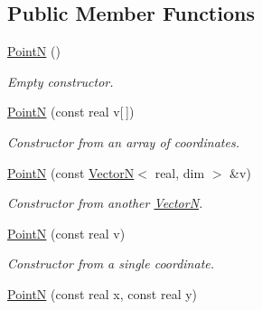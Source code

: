 \subsection*{Public Member Functions}
\begin{DoxyCompactItemize}
\item 
\hypertarget{classPointN_aeecdfb6e7bc275830b3910790a12d30c}{
\hyperlink{classPointN_aeecdfb6e7bc275830b3910790a12d30c}{PointN} ()}
\label{classPointN_aeecdfb6e7bc275830b3910790a12d30c}

\begin{DoxyCompactList}\small\item\em Empty constructor. \end{DoxyCompactList}\item 
\hypertarget{classPointN_a47ac5553535eb3ddf9a23fd9b2d18211}{
\hyperlink{classPointN_a47ac5553535eb3ddf9a23fd9b2d18211}{PointN} (const real v\mbox{[}$\,$\mbox{]})}
\label{classPointN_a47ac5553535eb3ddf9a23fd9b2d18211}

\begin{DoxyCompactList}\small\item\em Constructor from an array of coordinates. \end{DoxyCompactList}\item 
\hypertarget{classPointN_acdcac068cc838de9c2dd029c044d0cd3}{
\hyperlink{classPointN_acdcac068cc838de9c2dd029c044d0cd3}{PointN} (const \hyperlink{classVectorN}{VectorN}$<$ real, dim $>$ \&v)}
\label{classPointN_acdcac068cc838de9c2dd029c044d0cd3}

\begin{DoxyCompactList}\small\item\em Constructor from another \hyperlink{classVectorN}{VectorN}. \end{DoxyCompactList}\item 
\hypertarget{classPointN_a538c649af189bd38f47439f074a1b8ae}{
\hyperlink{classPointN_a538c649af189bd38f47439f074a1b8ae}{PointN} (const real v)}
\label{classPointN_a538c649af189bd38f47439f074a1b8ae}

\begin{DoxyCompactList}\small\item\em Constructor from a single coordinate. \end{DoxyCompactList}\item 
\hypertarget{classPointN_a18910c42eb7fc98373fcc45f3c87a6c7}{
\hyperlink{classPointN_a18910c42eb7fc98373fcc45f3c87a6c7}{PointN} (const real x, const real y)}
\label{classPointN_a18910c42eb7fc98373fcc45f3c87a6c7}


\end{DoxyCompactItemize}
